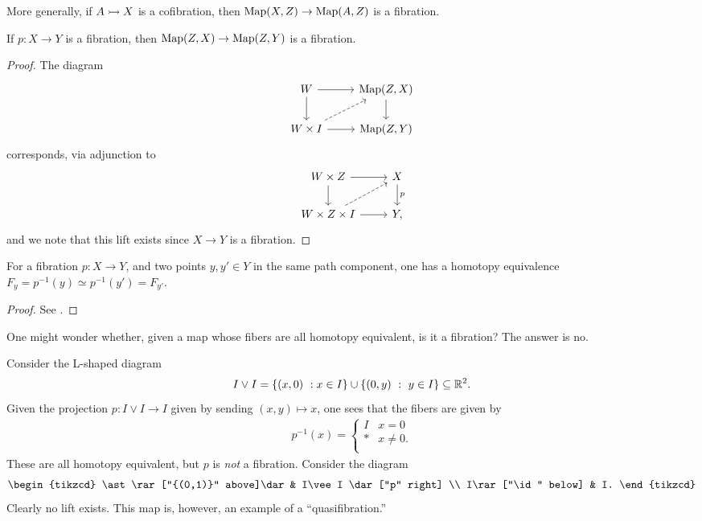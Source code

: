 \documentclass{article}[11pt]
\begin{document}
\begin{proposition} More generally, if $A \rightarrowtail X$ is a cofibration, then $\textup{Map}(X,Z) \to \textup{Map}(A,Z)$ is a fibration.
\end{proposition}

\begin{proposition} If $p : X \to Y$ is a fibration, then $\textup{Map}(Z,X) \to \textup{Map}(Z,Y)$ is a fibration.
\end{proposition}
\begin{proof} The diagram
\[
	\begin{tikzcd}
	W\rar\dar & \Map(Z,X)\dar \\
	W\times I\rar\ar[ur,dashed] & \Map(Z,Y)
	\end{tikzcd}
\]
corresponds, via adjunction to
\[
	\begin{tikzcd}
	W\times Z \rar\dar & X\dar["p" right] \\
	W\times Z \times I\rar\ar[ur,dashed] & Y,
	\end{tikzcd}
\]
and we note that this lift exists since $X\to Y$ is a fibration.
\end{proof}

\begin{proposition} For a fibration $p: X\to Y$, and two points $y,y'\in Y$ in the same path component, one has a homotopy equivalence $F_y = p^{-1}(y) \simeq p^{-1}(y') = F_{y'}$.
\end{proposition}
\begin{proof} See \cite[4.6.1]{hatcher}.
\end{proof}

One might wonder whether, given a map whose fibers are all homotopy equivalent, is it a fibration? The answer is no.

\begin{example} Consider the L-shaped diagram
\[
	I \vee I = \{(x,0) \ : x\in I\} \cup \{(0,y) \ : \ y\in I\}\subseteq \mathbb{R}^2.
\]
Given the projection $p : I\vee I \to I$ given by sending $(x,y) \mapsto x$, one sees that the fibers are given by
\begin{align*}
	p^{-1}(x) = \begin{cases} I & x=0 \\ \ast & x\neq 0. \\ \end{cases}
\end{align*}
These are all homotopy equivalent, but $p$ is \textit{not} a fibration. Consider the diagram
\[
	\begin{tikzcd}
	\ast\rar["{(0,1)}" above]\dar & I\vee I \dar["p" right] \\
	I\rar["\id" below] & I.
	\end{tikzcd}
\]
Clearly no lift exists. This map is, however, an example of a ``quasifibration.''
\end{example}
\end{document}
